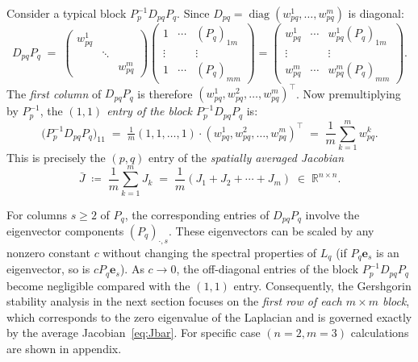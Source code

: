 \documentclass[12pt,a4paper]{article}
\theoremstyle{definition}
\begin{document}
\noindent
Consider a typical block $P_p^{-1} D_{pq} P_q$.
Since $D_{pq} = \operatorname{diag}(w^1_{pq},\ldots,w^m_{pq})$ is
diagonal:
\begin{equation*}
  D_{pq} P_q
  \;=\;
  \begin{pmatrix}
    w^1_{pq} & & \\
    & \ddots & \\
    & & w^m_{pq}
  \end{pmatrix}
  \begin{pmatrix}
    1 & \cdots & (P_q)_{1m} \\
    \vdots & & \vdots \\
    1 & \cdots & (P_q)_{mm}
  \end{pmatrix}
  =
  \begin{pmatrix}
    w^1_{pq} & \cdots & w^1_{pq}(P_q)_{1m} \\
    \vdots   &        & \vdots \\
    w^m_{pq} & \cdots & w^m_{pq}(P_q)_{mm}
  \end{pmatrix}.
  \label{eq:DPq}
\end{equation*}
The \emph{first column} of $D_{pq}P_q$ is therefore
$(w^1_{pq}, w^2_{pq}, \ldots, w^m_{pq})^{\top}$.
Now premultiplying by $P_p^{-1}$, the 
\emph{$(1,1)$ entry of the block $P_p^{-1}D_{pq}P_q$} is:
\begin{equation*}
  \bigl(P_p^{-1}D_{pq}P_q\bigr)_{11}
  \;=\;
  \tfrac{1}{m}(1,1,\ldots,1)
  \cdot
  (w^1_{pq}, w^2_{pq}, \ldots, w^m_{pq})^{\top}
  \;=\;
  \frac{1}{m}\sum_{k=1}^{m} w^{k}_{pq}.
  \label{eq:11entry}
\end{equation*}
This is precisely the $(p,q)$ entry of the \emph{spatially averaged
Jacobian}
\begin{equation*}
  \bar{J}
  \;\coloneqq\;
  \frac{1}{m}\sum_{k=1}^{m} J_k
  \;=\;
  \frac{1}{m}(J_1 + J_2 + \cdots + J_m)
  \;\in\; \mathbb{R}^{n \times n}.
  \label{eq:Jbar}
\end{equation*}


For columns $s \geq 2$ of $P_q$, the corresponding entries of
$D_{pq}P_q$ involve the eigenvector components $(P_q)_{\cdot,s}$.
These eigenvectors can be scaled by any nonzero constant $c$ without
changing the spectral properties of $L_q$ (if $P_q\mathbf{e}_s$ is an
eigenvector, so is $cP_q\mathbf{e}_s$).
As $c \to 0$, the off-diagonal entries of the block
$P_p^{-1}D_{pq}P_q$ become negligible compared with the
$(1,1)$ entry.
Consequently, the Gershgorin stability analysis in the next section
focuses on the \emph{first row of each $m \times m $ block}, which
corresponds to the zero eigenvalue of the Laplacian and is governed
exactly by the average Jacobian~\eqref{eq:Jbar}. For specific case $(n=2, m=3)$ calculations are shown in appendix. 
\end{document}
